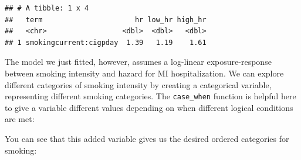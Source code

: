 \documentclass[
]{book}
\newenvironment{Shaded}{\begin{snugshade}}{\end{snugshade}}
\newcommand{\DataTypeTok}[1]{\textcolor[rgb]{0.13,0.29,0.53}{#1}}
\newcommand{\DecValTok}[1]{\textcolor[rgb]{0.00,0.00,0.81}{#1}}
\newcommand{\KeywordTok}[1]{\textcolor[rgb]{0.13,0.29,0.53}{\textbf{#1}}}
\newcommand{\NormalTok}[1]{#1}
\newcommand{\OperatorTok}[1]{\textcolor[rgb]{0.81,0.36,0.00}{\textbf{#1}}}
\newcommand{\OtherTok}[1]{\textcolor[rgb]{0.56,0.35,0.01}{#1}}
\newcommand{\StringTok}[1]{\textcolor[rgb]{0.31,0.60,0.02}{#1}}
\begin{document}
\begin{verbatim}
## # A tibble: 1 x 4
##   term                      hr low_hr high_hr
##   <chr>                  <dbl>  <dbl>   <dbl>
## 1 smokingcurrent:cigpday  1.39   1.19    1.61
\end{verbatim}

The model we just fitted, however, assumes a log-linear exposure-response between smoking intensity and hazard for MI hospitalization. We can explore different categories of smoking intensity by creating a categorical variable, representing different smoking categories. The \texttt{case\_when} function is helpful here to give a variable different values depending on when different logical conditions are met:

\begin{Shaded}
\end{Shaded}

You can see that this added variable gives us the desired ordered categories for smoking:
\end{document}
